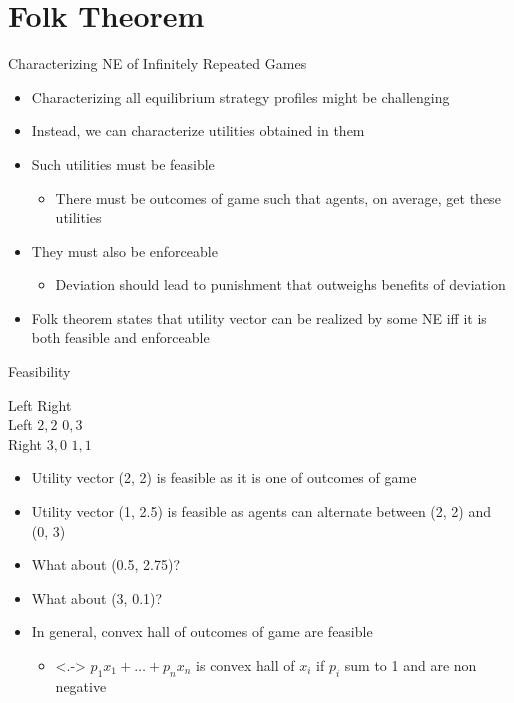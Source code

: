 \documentclass[11pt,aspectratio=169,handout]{beamer}
\begin{document}
  
 \section{Folk Theorem}  
  
  \begin{frame}{Characterizing NE of Infinitely Repeated Games}
   \begin{itemize}[<+->]
   \setlength{\itemsep}{0.7em}
    \item Characterizing all equilibrium strategy profiles might be challenging
    \item Instead, we can characterize utilities obtained in them
    \item Such utilities must be \alert{feasible}
    \begin{itemize}[<.->]
     \item There must be outcomes of game such that agents, on average, get these utilities
    \end{itemize}
    \item They must also be \alert{enforceable}
    \begin{itemize}[<.->]
     \item Deviation should lead to punishment that outweighs benefits of deviation
    \end{itemize}
    \item \alert{Folk theorem} states that utility vector can be realized by some NE iff it is both feasible and enforceable
   \end{itemize}
  \end{frame}
  
  
  \begin{frame}{Feasibility}
   \begin{center}
    \hspace{-2em}
    \begin{game}{2}{2}
     		\> Left		\> Right		\\
     Left	\> $2, 2$	\> $0, 3$	\\
     Right	\> $3, 0$	\> $1, 1$
    \end{game}
   \end{center}
   \begin{itemize}[<+->]
    \item Utility vector (2, 2) is feasible as it is one of outcomes of game
    \item Utility vector (1, 2.5) is feasible as agents can alternate between (2, 2) and (0, 3)
    \item What about (0.5, 2.75)?
    \item What about (3, 0.1)?
    \item In general, convex hall of outcomes of game are feasible
    \begin{itemize}
     \item<.-> $p_1x_1 + \dots + p_nx_n$ is convex hall of $x_i$ if $p_i$ sum to 1 and are non negative
    \end{itemize}
   \end{itemize}
  \end{frame}
\end{document}
